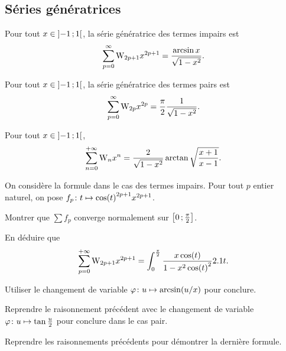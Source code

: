 \subsection{Séries génératrices}


\begin{prop}{}
Pour tout $x \in \interoo{-1}{1}$, la série génératrice des termes impairs est
$$\sum_{p=0}^\infty \Wallis_{2p+1} x^{2p+1} = \frac{\arcsin x}{\sqrt{1-x^2}}.$$

Pour tout $x \in \interoo{-1}{1}$, la série génératrice des termes pairs est 
$$\sum_{p=0}^\infty \Wallis_{2p} x^{2p} = \frac{\pi}{2} \frac{1}{\sqrt{1-x^2}}.$$

Pour tout $x \in \interoo{-1}{1}$,
\[
\sum_{n=0}^{+\infty} \Wallis_n x^n = \frac{2}{\sqrt{1 - x^2}} \arctan\sqrt{\frac{x + 1}{x - 1}}.
\]
\end{prop}


\begin{exercice}
On considère la formule dans le cas des termes impairs. Pour tout $p$ entier naturel, on pose $\fonctionligne[f_p]{t}{\cos(t)^{2p+1} x^{2p+1}}$.
\begin{questions}
\item Montrer que $\sum f_p$ converge normalement sur $\interff{0}{\frac{\pi}{2}}$.

\item En déduire que
\[
\sum_{p=0}^{+\infty} \Wallis_{2p+1} x^{2p+1} = \int_0^{\frac{\pi}{2}} \frac{x \cos(t)}{1 - x^2 \cos(t)^2} \d t.
\]

\item Utiliser le changement de variable $\fonctionligne[\varphi]{u}{\arcsin(u/x)}$ pour conclure.

\item Reprendre le raisonnement précédent avec le changement de variable $\fonctionligne[\varphi]{u}{\tan\frac{u}{2}}$ pour conclure dans le cas pair.

\item Reprendre les raisonnements précédents pour démontrer la dernière formule.
\end{questions}
\end{exercice}

